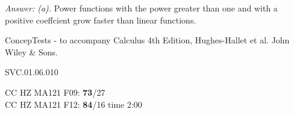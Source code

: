 {\it Answer: (a).} Power functions with the power greater than one and with a positive coeffcient grow faster than linear functions.

\medskip
ConcepTests - to accompany Calculus 4th Edition, Hughes-Hallet et al. John Wiley \& Sons.

SVC.01.06.010

CC HZ MA121 F09: {\bf 73}/27  \\
CC HZ MA121 F12: {\bf 84}/16 time 2:00  \\
